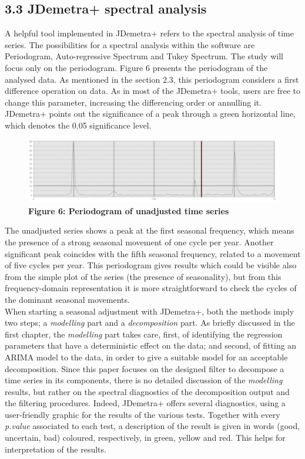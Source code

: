 \documentclass{article}
\begin{document}
\subsection*{\small 3.3 JDemetra+ spectral analysis}
A helpful tool implemented in JDemetra+ refers to the spectral analysis of time series. The possibilities for a spectral analysis within the software are Periodogram, Auto-regressive Spectrum and Tukey Spectrum. The study will focus only on the periodogram. Figure 6 presents the periodogram of the analysed data. As mentioned in the section 2.3, this periodogram considers a first difference operation on data. As in most of the JDemetra+ tools, users are free to change this parameter, increasing the differencing order or annulling it. JDemetra+ points out the significance of a peak through a green horizontal line, which denotes the 0.05 significance level.
\begin{figure}[H]
\centering
  \includegraphics[width=\linewidth]{../images/capitolo3/amsper.jpg}
  {\textbf{\scriptsize Figure 6: Periodogram of unadjusted time series}}
  \label{fig:1}
\end{figure}
The unadjusted series shows a peak at the first seasonal frequency, which means the presence of a strong seasonal movement of one cycle per year. Another significant peak coincides with the fifth seasonal frequency, related to a movement of five cycles per year. This periodogram gives results which could be visible also from the simple plot of the series (the presence of seasonality), but from this frequency-domain representation it is more straightforward to check the cycles of the dominant seasonal movements.\\When starting a seasonal adjustment with JDemetra+, both the methods imply two steps; a \textit{modelling} part and a \textit{decomposition} part. As briefly discussed in the first chapter, the \textit{modelling} part takes care, first, of identifying the regression parameters that have a deterministic effect on the data; and second, of fitting an ARIMA model to the data, in order to give a suitable model for an acceptable decomposition. Since this paper focuses on the designed filter to decompose a time series in its components, there is no detailed discussion of the \textit{modelling} results, but rather on the spectral diagnostics of the decomposition output and the filtering procedures. Indeed, JDemetra+ offers several diagnostics, using a user-friendly graphic for the results of the various tests. Together with every \textit{p.value} associated to each test, a description of the result is given in words (good, uncertain, bad) coloured, respectively, in green, yellow and red. This helps for interpretation of the results.
\end{document}
